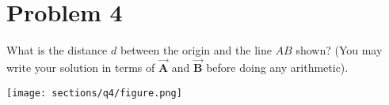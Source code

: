 \section*{Problem 4}

What is the distance \( d \) between the origin and the line \( AB \) shown?
(You may write your solution in terms of \( \vec{\mathbf{A}} \) and \( \vec{\mathbf{B}} \) before doing any arithmetic).

\begin{figure*}[h]
    \centering
    \texttt{[image: sections/q4/figure.png]}
\end{figure*}
